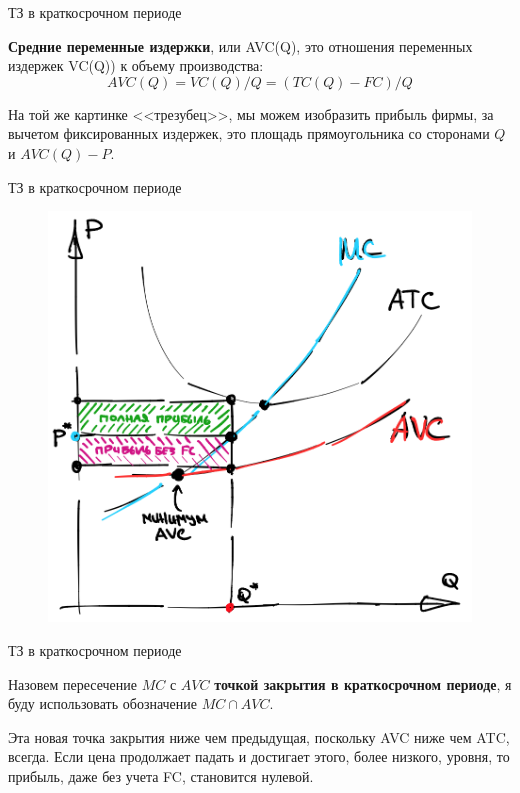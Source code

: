 \documentclass{beamer}
\begin{document}
\begin{frame}{ТЗ в краткосрочном периоде}

\begin{definition}
\textbf{Средние переменные издержки}, или AVC(Q), это отношения переменных издержек VC(Q)) к объему производства:
$$AVC(Q) = VC(Q)/Q = (TC(Q) - FC)/Q$$
\end{definition}

На той же картинке <<трезубец>>, мы можем изобразить прибыль фирмы, за вычетом фиксированных издержек, это площадь прямоугольника со сторонами $Q$ и $AVC(Q)-P$. 

\end{frame}

\begin{frame}{ТЗ в краткосрочном периоде}

\begin{figure}[hbt]
\centering
\includegraphics[width=.7 \textwidth]{trident2.png}
\end{figure}

\end{frame}


\begin{frame}{ТЗ в краткосрочном периоде}

\begin{definition}
Назовем пересечение $MC$ с $AVC$ \textbf{точкой закрытия в краткосрочном периоде}, я буду использовать обозначение $MC \cap AVC$.
\end{definition}

Эта новая точка закрытия ниже чем предыдущая, поскольку AVC ниже чем ATC, всегда. Если цена продолжает падать и достигает этого, более низкого, уровня, то прибыль, даже без учета FC, становится нулевой.

\end{frame}
\end{document}
